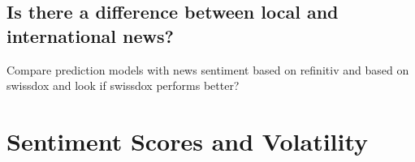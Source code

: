 \subsection{Is there a difference between local and international news?}

Compare prediction models with news sentiment based on refinitiv and based on swissdox and look if swissdox performs better?

\section{Sentiment Scores and Volatility}

\cite{audrino2020}

%
%
%
%
%
%
%
%
%



\cleardoublepage
